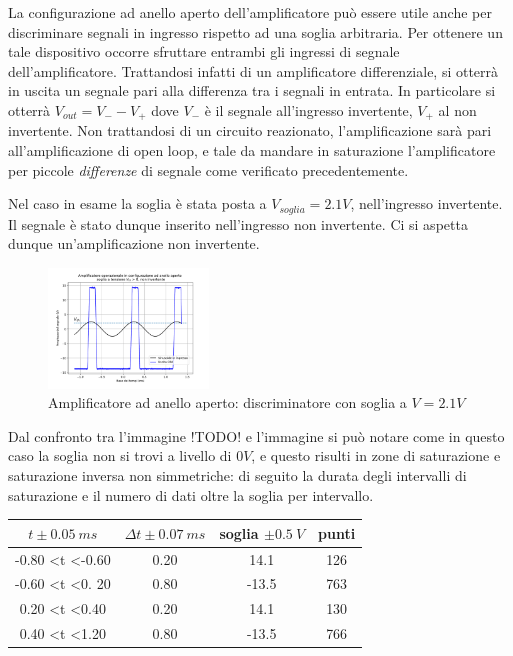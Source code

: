 \documentclass[journal]{IEEEtran}
\begin{document}
La configurazione ad anello aperto dell'amplificatore può essere utile anche per discriminare segnali in ingresso rispetto ad una soglia arbitraria.
Per ottenere un tale dispositivo occorre sfruttare entrambi gli ingressi di segnale dell'amplificatore. Trattandosi infatti di un amplificatore differenziale, si otterrà in
uscita un segnale pari alla differenza tra i segnali in entrata. In particolare si otterrà $V_{out} = V_{-} - V_{+}$ dove $V_{-}$ è il segnale all'ingresso invertente, $V_{+
}$ al non invertente.
Non trattandosi di un circuito reazionato, l'amplificazione sarà pari all'amplificazione di open loop, e tale da mandare in saturazione l'amplificatore per piccole
\textit{differenze} di segnale come verificato precedentemente.

Nel caso in esame la soglia è stata posta a $V_{soglia} = 2.1 V$, nell'ingresso invertente.
Il segnale è stato dunque inserito nell'ingresso non invertente. Ci si aspetta dunque un'amplificazione non invertente.

\begin{figure}[H]%
\begin {center}
\includegraphics[width=0.38\textwidth]{analysis/output/OPA-open-loop-biased_threshold.pdf}
\caption{Amplificatore ad anello aperto: discriminatore con soglia a $V = 2.1 V$}
\label{fig:oscilloscope}
\end {center}
\end{figure}


Dal confronto tra l'immagine !TODO! e l'immagine si può notare come in questo caso la soglia non si trovi a livello di $0 V$, e questo risulti in zone di saturazione e
saturazione inversa non simmetriche: di seguito la durata degli intervalli di saturazione e il numero di dati oltre la soglia per intervallo.

\begin{tabular}{|c|c|c|c|}
\hline
$t  \pm 0.05 \ ms$ & $\Delta t \pm 0.07 \ ms$ & soglia $\pm 0.5 \ V$ & punti \\ \hline
-0.80 \textless t \textless -0.60 & 0.20 & 14.1  & 126 \\ \hline
-0.60 \textless t \textless 0. 20 & 0.80 & -13.5 & 763 \\ \hline
0.20 \textless t \textless 0.40   & 0.20 & 14.1  & 130 \\ \hline
0.40 \textless t \textless 1.20   & 0.80 & -13.5 & 766 \\ \hline
\end{tabular}
\end{document}
